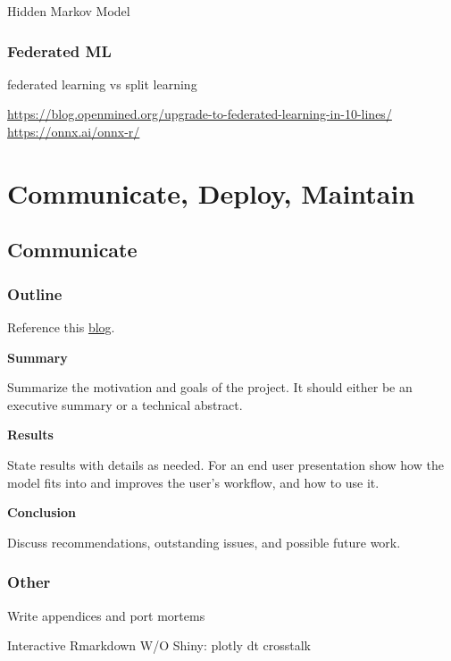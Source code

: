 \documentclass[]{book}
\begin{document}
Hidden Markov Model

\hypertarget{federated-ml}{%
\subsection{Federated ML}\label{federated-ml}}

federated learning vs split learning

\url{https://blog.openmined.org/upgrade-to-federated-learning-in-10-lines/} \url{https://onnx.ai/onnx-r/}

\hypertarget{communicate-deploy-maintain}{%
\chapter{Communicate, Deploy, Maintain}\label{communicate-deploy-maintain}}

\hypertarget{communicate}{%
\section{Communicate}\label{communicate}}

\hypertarget{outline}{%
\subsection{Outline}\label{outline}}

Reference this \href{https://www.dataquest.io/blog/data-science-project-style-guide/}{blog}.

\textbf{Summary}

Summarize the motivation and goals of the project. It should either be an executive summary or a technical abstract.

\textbf{Results}

State results with details as needed. For an end user presentation show how the model fits into and improves the user's workflow, and how to use it.

\textbf{Conclusion}

Discuss recommendations, outstanding issues, and possible future work.

\hypertarget{other}{%
\subsection{Other}\label{other}}

Write appendices and port mortems

Interactive Rmarkdown W/O Shiny: plotly dt crosstalk
\end{document}
